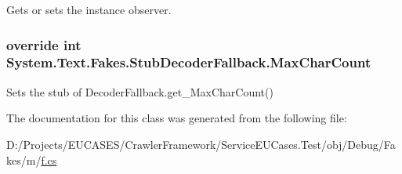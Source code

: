 Gets or sets the instance observer.

\hypertarget{class_system_1_1_text_1_1_fakes_1_1_stub_decoder_fallback_ae76266678bcc45a0563f6c7629e629ae}{
\subsubsection[{Max\-Char\-Count}]{\setlength{\rightskip}{0pt plus 5cm}override int System.\-Text.\-Fakes.\-Stub\-Decoder\-Fallback.\-Max\-Char\-Count\hspace{0.3cm}{\ttfamily [get]}}}\label{class_system_1_1_text_1_1_fakes_1_1_stub_decoder_fallback_ae76266678bcc45a0563f6c7629e629ae}


Sets the stub of Decoder\-Fallback.\-get\-\_\-\-Max\-Char\-Count()



The documentation for this class was generated from the following file\-:\begin{DoxyCompactItemize}
\item 
D\-:/\-Projects/\-E\-U\-C\-A\-S\-E\-S/\-Crawler\-Framework/\-Service\-E\-U\-Cases.\-Test/obj/\-Debug/\-Fakes/m/\hyperlink{m_2f_8cs}{f.\-cs}\end{DoxyCompactItemize}
